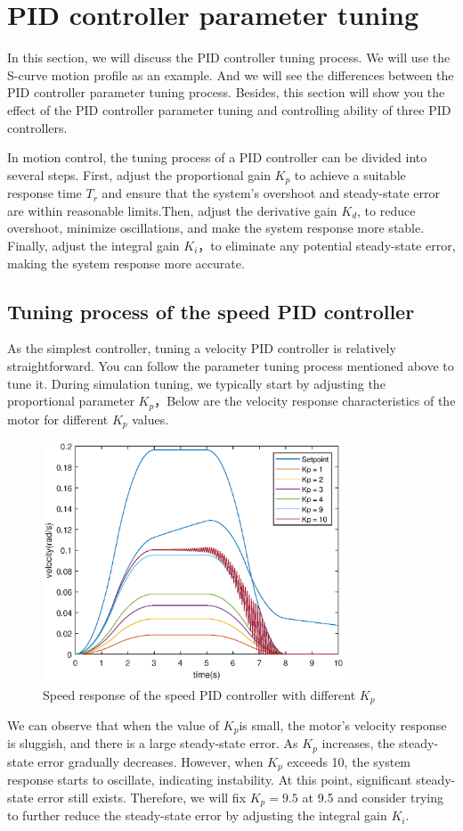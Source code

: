 \documentclass[11pt,a4paper]{article}%
\begin{document}
\newpage
\section{PID controller parameter tuning}
In this section, we will discuss the PID controller tuning process. We will use the S-curve motion profile as an example.
And we will see the differences between the PID controller parameter tuning process. Besides, this section will show you
the effect of the PID controller parameter tuning and controlling ability of three PID controllers.

In motion control, the tuning process of a PID controller can be divided into several steps. First, adjust the proportional gain $K_p$ to achieve a suitable response time $T_r$ and ensure that the system's overshoot and steady-state error are within reasonable limits.Then, adjust the derivative gain $K_d$, to reduce overshoot, minimize oscillations, and make the system response more stable. Finally, adjust the integral gain $K_i$，to eliminate any potential steady-state error, making the system response more accurate.
\subsection{Tuning process of the speed PID controller}
As the simplest controller, tuning a velocity PID controller is relatively straightforward. You can follow the parameter tuning process mentioned above to tune it. During simulation tuning, we typically start by adjusting the proportional parameter $K_p$，Below are the velocity response characteristics of the motor for different $K_p$ values.

\begin{figure}[H]
    \centering  
    \includegraphics[width=0.8\textwidth]{SpeedKp}
    \caption{Speed response of the speed PID controller with different $K_p$}
    \label{SpeedKp}
\end{figure}
We can observe that when the value of $K_p$is small, the motor's velocity response is sluggish, and there is a large steady-state error. As $K_p$ increases, the steady-state error gradually decreases. However, when $K_p$ exceeds 10, the system response starts to oscillate, indicating instability. 
At this point, significant steady-state error still exists. Therefore, we will fix $K_p=9.5$ at 9.5 and consider trying to further reduce the steady-state error by adjusting the integral gain $K_i$.
\end{document}
